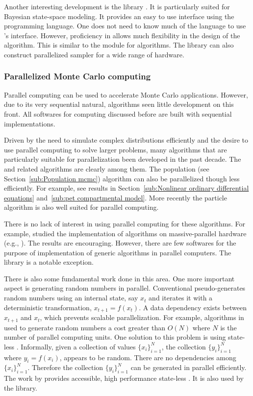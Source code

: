Another interesting development is the \libbi library \cite{libbi}. It is particularly suited for Bayesian state-space modeling. It provides an easy to use interface using the \perl programming language. One does not need to know much of the language to use \libbi's interface. However, proficiency in \perl allows much flexibility in the design of the algorithm. This is similar to the \pymc module for \mcmc algorithms. The library can also construct parallelized sampler for a wide range of hardware.

\subsubsection{Parallelized Monte Carlo computing}
\label{ssub:Parallelized Monte Carlo computing}

Parallel computing can be used to accelerate Monte Carlo applications. However, due to its very sequential natural, \mcmc algorithms  seen little development on this front. All softwares for \mcmc computing discussed before are built with sequential implementations.

Driven by the need to simulate complex distributions efficiently and the desire to use parallel computing to solve larger problems, many algorithms that are particularly suitable for parallelization  been developed in the past decade. The \smc and related algorithms are clearly among them. The population \mcmc (see Section~\ref{sub:Population mcmc}) algorithm can also be parallelized though less efficiently. For example, see results in Section~\ref{sub:Nonlinear ordinary differential equations} and~\ref{sub:pet compartmental model}. More recently the particle \mcmc algorithm \cite{Andrieu:2010gc} is also well suited for parallel computing.

There is no lack of interest in using parallel computing for these algorithms. For example, \cite{Lee:2010fm} studied the implementation of \smc algorithms on massive-parallel hardware (e.g., \gpu). The results are encouraging. However, there are few softwares for the purpose of implementation of generic \smc algorithms in parallel computers. The \libbi library is a notable exception.

There is also some fundamental work done in this area. One more important aspect is generating random numbers in parallel. Conventional pseudo-\rng generates random numbers using an internal state, say $x_t$ and iterates it with a deterministic transformation, $x_{t+1} = f(x_t)$. A data dependency exists between $x_{t+1}$ and $x_t$, which prevents scalable parallelization. For example, algorithms in \cite{Lee:2010fm} used to generate random numbers  a cost greater than $O(N)$ where $N$ is the number of parallel computing units. One solution to this problem is using state-less \rng. Informally, given a collection of values $\{x_i\}_{i=1}^N$, the collection $\{y_i\}_{i=1}^N$ where $y_i = f(x_i)$, appears to be random. There are no dependencies among $\{x_i\}_{i=1}^N$. Therefore the collection $\{y_i\}_{i=1}^N$ can be generated in parallel efficiently. The work by \cite{Salmon:2011um} provides accessible, high performance state-less \rng. It is also used by the \vsmc library.

